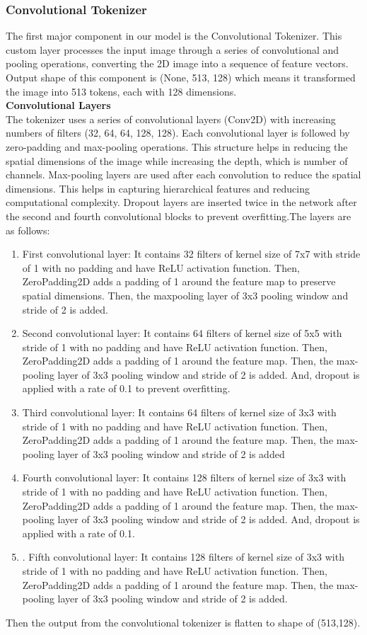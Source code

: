 \documentclass{ioereport}
\begin{document}
\subsubsection{Convolutional Tokenizer}
The first major component in our model is the Convolutional Tokenizer. This custom
layer processes the input image through a series of convolutional and pooling
operations, converting the 2D image into a sequence of feature vectors. Output shape of this component is (None, 513, 128) which means it transformed the image into 513
tokens, each with 128 dimensions.\\
\textbf{Convolutional Layers}\\
The tokenizer uses a series of convolutional layers (Conv2D) with increasing numbers
of filters (32, 64, 64, 128, 128). Each convolutional layer is followed by zero-padding
and max-pooling operations. This structure helps in reducing the spatial dimensions of
the image while increasing the depth, which is number of channels. Max-pooling layers
are used after each convolution to reduce the spatial dimensions. This helps in capturing
hierarchical features and reducing computational complexity. Dropout layers are
inserted twice in the network after the second and fourth convolutional blocks to
prevent overfitting.The layers are as follows:
\begin{enumerate}
    \item First convolutional layer: It contains 32 filters of kernel size of 7x7 with stride of 1
with no padding and have ReLU activation function. Then, ZeroPadding2D adds a
padding of 1 around the feature map to preserve spatial dimensions. Then, the maxpooling layer of 3x3 pooling window and stride of 2 is added.
\item  Second convolutional layer: It contains 64 filters of kernel size of 5x5 with stride of
1 with no padding and have ReLU activation function. Then, ZeroPadding2D adds a
padding of 1 around the feature map. Then, the max-pooling layer of 3x3 pooling
window and stride of 2 is added. And, dropout is applied with a rate of 0.1 to prevent
overfitting.
\item Third convolutional layer: It contains 64 filters of kernel size of 3x3 with stride of 1
with no padding and have ReLU activation function. Then, ZeroPadding2D adds a
padding of 1 around the feature map. Then, the max-pooling layer of 3x3 pooling
window and stride of 2 is added
\item  Fourth convolutional layer: It contains 128 filters of kernel size of 3x3 with stride of
1 with no padding and have ReLU activation function. Then, ZeroPadding2D adds a
padding of 1 around the feature map. Then, the max-pooling layer of 3x3 pooling
window and stride of 2 is added. And, dropout is applied with a rate of 0.1.
\item . Fifth convolutional layer: It contains 128 filters of kernel size of 3x3 with stride of 1
with no padding and have ReLU activation function. Then, ZeroPadding2D adds a
padding of 1 around the feature map. Then, the max-pooling layer of 3x3 pooling
window and stride of 2 is added. 


\end{enumerate}
Then the output from the convolutional tokenizer is flatten to shape of (513,128).
\end{document}
